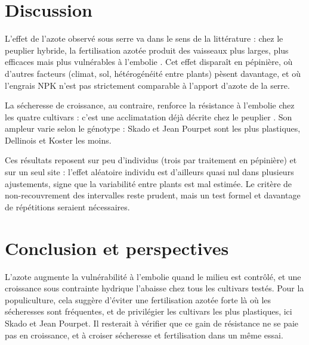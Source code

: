\documentclass[11pt,a4paper]{article}
\begin{document}
\section{Discussion}
L'effet de l'azote observé sous serre va dans le sens de la littérature : chez le peuplier hybride, la fertilisation azotée produit des vaisseaux plus larges, plus efficaces mais plus vulnérables à l'embolie \parencite{plavcova2012}. Cet effet disparaît en pépinière, où d'autres facteurs (climat, sol, hétérogénéité entre plants) pèsent davantage, et où l'engrais NPK n'est pas strictement comparable à l'apport d'azote de la serre.

La sécheresse de croissance, au contraire, renforce la résistance à l'embolie chez les quatre cultivars : c'est une acclimatation déjà décrite chez le peuplier \parencite{awad2010}. Son ampleur varie selon le génotype : Skado et Jean Pourpet sont les plus plastiques, Dellinois et Koster les moins.

Ces résultats reposent sur peu d'individus (trois par traitement en pépinière) et sur un seul site : l'effet aléatoire individu est d'ailleurs quasi nul dans plusieurs ajustements, signe que la variabilité entre plants est mal estimée. Le critère de non-recouvrement des intervalles reste prudent, mais un test formel et davantage de répétitions seraient nécessaires.


\section{Conclusion et perspectives}
L'azote augmente la vulnérabilité à l'embolie quand le milieu est contrôlé, et une croissance sous contrainte hydrique l'abaisse chez tous les cultivars testés. Pour la populiculture, cela suggère d'éviter une fertilisation azotée forte là où les sécheresses sont fréquentes, et de privilégier les cultivars les plus plastiques, ici Skado et Jean Pourpet. Il resterait à vérifier que ce gain de résistance ne se paie pas en croissance, et à croiser sécheresse et fertilisation dans un même essai.

\pagebiblio
\end{document}
